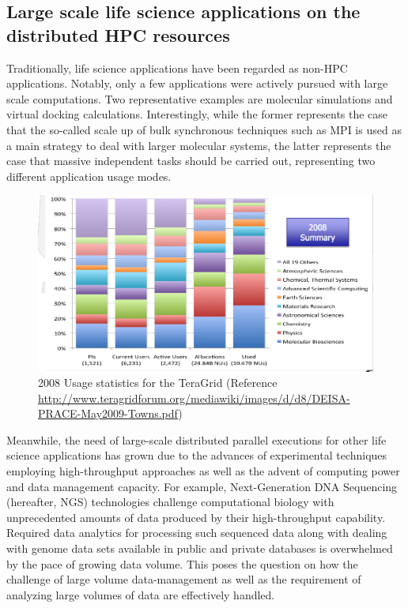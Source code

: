 \documentclass{sig-alternate}
\begin{document}
\subsection{Large scale life science applications on the distributed HPC resources}
Traditionally, life science applications have been regarded as non-HPC
applications.  Notably, only a few applications were actively pursued with
large scale computations.  Two representative examples are molecular
simulations and virtual docking calculations.  Interestingly, while
the former represents the case that the so-called scale up of bulk
synchronous techniques such as MPI is used as a main strategy to deal with
larger molecular systems, the latter represents the case that massive
independent tasks should be carried out, representing two different
application usage modes.

\begin{figure}
 \centering
\includegraphics[scale=0.27]{figures/teragrid-discipline08}
\caption{\small 2008 Usage statistics for the TeraGrid (Reference
  \url{http://www.teragridforum.org/mediawiki/images/d/d8/DEISA-PRACE-May2009-Towns.pdf})}
  \label{tg2008}
\end{figure}

Meanwhile, the need of large-scale distributed parallel executions for
other life science applications has grown due to the advances of
experimental techniques employing high-throughput approaches as well as
the advent of computing power and data management capacity.  For
example, Next-Generation DNA Sequencing (hereafter, NGS) technologies
challenge computational biology with unprecedented amounts of data
produced by their high-throughput capability.  Required data analytics
for processing such sequenced data along with dealing with genome data
sets available in public and private databases is overwhelmed by the
pace of growing data volume.  This poses the question on how the
challenge of large volume data-management as well as the requirement
of analyzing large volumes of data are effectively handled.
\end{document}
